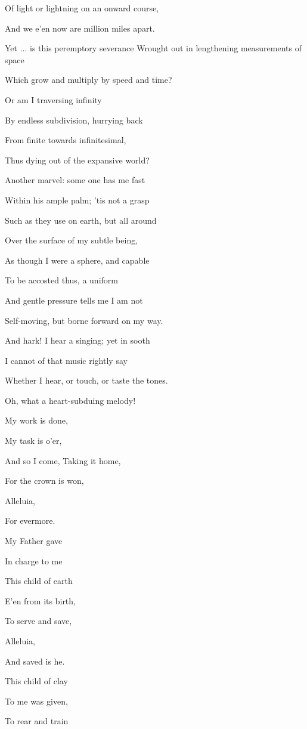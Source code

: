 Of light or lightning on an onward course,

And we e'en now are million miles apart.

Yet ... is this peremptory severance Wrought out in lengthening measurements of space

Which grow and multiply by speed and time?

Or am I traversing infinity

By endless subdivision, hurrying back

From finite towards infinitesimal,

Thus dying out of the expansive world?

Another marvel: some one has me fast

Within his ample palm; 'tis not a grasp

Such as they use on earth, but all around

Over the surface of my subtle being,

As though I were a sphere, and capable

To be accosted thus, a uniform

And gentle pressure tells me I am not

Self-moving, but borne forward on my way.

And hark! I hear a singing; yet in sooth

I cannot of that music rightly say

Whether I hear, or touch, or taste the tones.

Oh, what a heart-subduing melody!


My work is done,

My task is o'er,

And so I come, Taking it home,

For the crown is won,

Alleluia,

For evermore.

My Father gave

In charge to me

This child of earth

E'en from its birth,

To serve and save,

Alleluia,

And saved is he.

This child of clay

To me was given,

To rear and train

